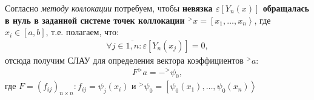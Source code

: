 \documentclass[__main__.tex]{subfiles}
\begin{document}
Согласно \emph{методу коллокации} потребуем, чтобы \textbf{невязка $\varepsilon[Y_n(x)]$ обращалась в нуль в заданной системе точек коллокации ${^>x}=\left[x_1,\dots,x_n\right>$}, где $x_i\in[a,b]$, т.е. полагаем, что:
\begin{gather}
\forall{j\in\overline{1,n}}\colon\varepsilon[Y_n(x_j)]=0,
\end{gather}
отсюда получим СЛАУ для определения вектора коэффициентов ${^>a}$:
\begin{gather}
F{^>a} = -{^>\psi_0},
\end{gather}
где $F=(f_{ij})_{n\times n}\colon f_{ij}=\psi_{j}(x_i)$ и ${^>\psi_0}=\left[\psi_0(x_1),\dots,\psi_0(x_n)\right>$
\end{document}
